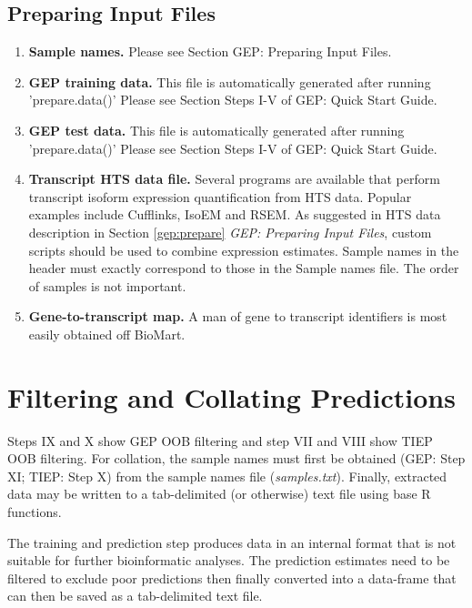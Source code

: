 \documentclass[a4paper,12pt]{article}
\begin{document}
\subsection{Preparing Input Files}
\label{tiep:prepare}
\begin{enumerate}
\item \textbf{Sample names.} Please see Section GEP: Preparing Input Files.

\item \textbf{GEP training data.} This file is automatically generated after running 'prepare.data()' Please see Section Steps I-V of GEP: Quick Start Guide.

\item \textbf{GEP test data.} This file is automatically generated after running 'prepare.data()' Please see Section Steps I-V of GEP: Quick Start Guide.

\item \textbf{Transcript HTS data file.} Several programs are available that perform transcript isoform expression quantification from HTS data. Popular examples include \textsf{Cufflinks}, \textsf{IsoEM} and \textsf{RSEM}. As suggested in HTS data description in Section \ref{gep:prepare} \textit{GEP: Preparing Input Files}, custom scripts should be used to combine expression estimates. Sample names in the header must exactly correspond to those in the Sample names file. The order of samples is not important.

\item \textbf{Gene-to-transcript map.} A man of gene to transcript identifiers is most easily obtained off \textsf{BioMart}.
\end{enumerate}

\section{Filtering and Collating Predictions}
\label{filtering}
Steps IX and X show GEP OOB filtering and step VII and VIII show TIEP OOB filtering. For collation, the sample names must first be obtained (GEP: Step XI; TIEP: Step X) from the sample names file (\textit{samples.txt}). Finally, extracted data may be written to a tab-delimited (or otherwise) text file using base \textsf{R} functions.

The training and prediction step produces data in an internal format that is not suitable for further bioinformatic analyses. The prediction estimates need to be filtered to exclude poor predictions then finally converted into a data-frame that can then be saved as a tab-delimited text file.
\end{document}
